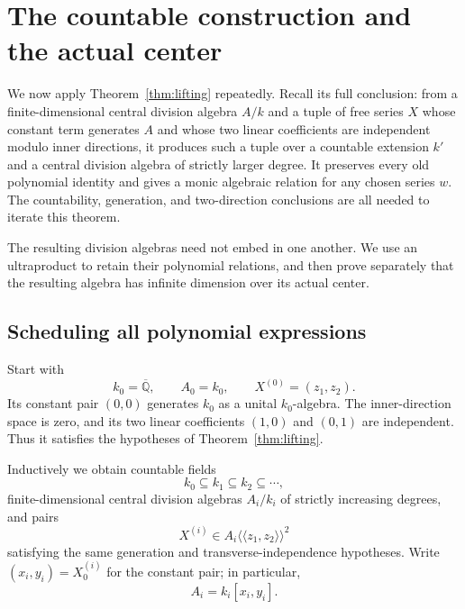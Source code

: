 \section{The countable construction and the actual center}
\label{sec:countable-construction}

We now apply Theorem~\ref{thm:lifting} repeatedly.  Recall its
full conclusion: from a finite-dimensional central division algebra $A/k$
and a tuple of free series $X$ whose constant term generates $A$ and whose
two linear coefficients are independent modulo inner directions, it
produces such a tuple over a countable extension $k'$ and a central
division algebra of strictly larger degree.  It preserves every old
polynomial identity and gives a monic algebraic relation for any chosen
series $w$.  The countability, generation, and two-direction conclusions
are all needed to iterate this theorem.

The resulting division algebras need not embed in one another.  We use
an ultraproduct to retain their polynomial relations, and then prove
separately that the resulting algebra has infinite dimension over its
actual center.

\subsection{Scheduling all polynomial expressions}

Start with
\[
 k_0=\overline{\mathbb Q},\qquad A_0=k_0,\qquad
 X^{(0)}=(z_1,z_2).
\]
Its constant pair $(0,0)$ generates $k_0$ as a unital $k_0$-algebra.
The inner-direction space is zero, and its two linear coefficients
$(1,0)$ and $(0,1)$ are independent.  Thus it satisfies the hypotheses
of Theorem~\ref{thm:lifting}.

Inductively we obtain countable fields
\[
 k_0\subseteq k_1\subseteq k_2\subseteq\cdots,
\]
finite-dimensional central division algebras $A_i/k_i$ of strictly
increasing degrees, and pairs
\[
 X^{(i)}\in A_i\langle\!\langle z_1,z_2\rangle\!\rangle^2
\]
satisfying the same generation and transverse-independence hypotheses.
Write $(x_i,y_i)=X^{(i)}_0$ for the constant pair; in particular,
\begin{equation}
 A_i=k_i[x_i,y_i].
 \label{eq:stage-generation}
\end{equation}

